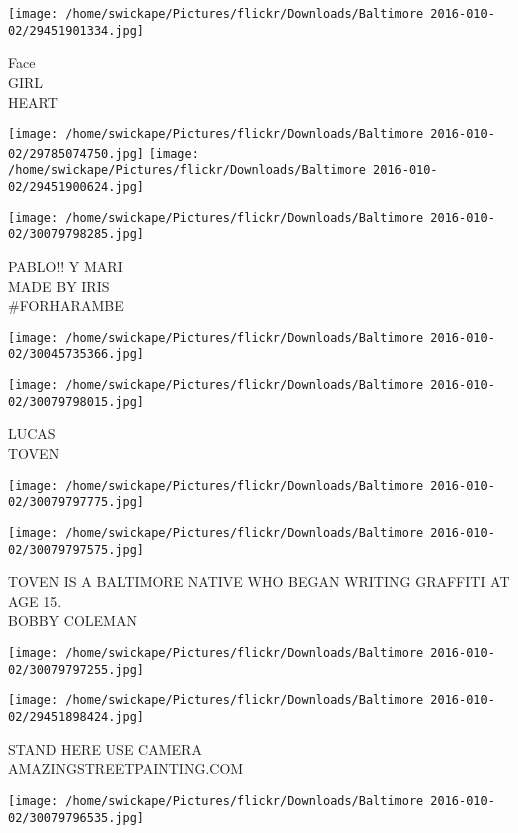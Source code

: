 \documentclass[10pt,letterpaper]{article}
\begin{document}
\vspace{0.25in}
\texttt{[image: /home/swickape/Pictures/flickr/Downloads/Baltimore 2016-010-02/29451901334.jpg]}

Face\\
GIRL\\
HEART
\pagebreak

\texttt{[image: /home/swickape/Pictures/flickr/Downloads/Baltimore 2016-010-02/29785074750.jpg]}
\texttt{[image: /home/swickape/Pictures/flickr/Downloads/Baltimore 2016-010-02/29451900624.jpg]}

\vspace{0.25in}
\texttt{[image: /home/swickape/Pictures/flickr/Downloads/Baltimore 2016-010-02/30079798285.jpg]}

PABLO!! Y MARI\\
MADE BY IRIS\\
\#FORHARAMBE
\pagebreak

\texttt{[image: /home/swickape/Pictures/flickr/Downloads/Baltimore 2016-010-02/30045735366.jpg]}

\vspace{0.25in}
\texttt{[image: /home/swickape/Pictures/flickr/Downloads/Baltimore 2016-010-02/30079798015.jpg]}

LUCAS\\
TOVEN
\pagebreak

\texttt{[image: /home/swickape/Pictures/flickr/Downloads/Baltimore 2016-010-02/30079797775.jpg]}

\vspace{0.25in}
\texttt{[image: /home/swickape/Pictures/flickr/Downloads/Baltimore 2016-010-02/30079797575.jpg]}

TOVEN IS A BALTIMORE NATIVE WHO BEGAN WRITING GRAFFITI AT AGE 15.\\
BOBBY COLEMAN
\pagebreak

\texttt{[image: /home/swickape/Pictures/flickr/Downloads/Baltimore 2016-010-02/30079797255.jpg]}

\vspace{0.25in}
\texttt{[image: /home/swickape/Pictures/flickr/Downloads/Baltimore 2016-010-02/29451898424.jpg]}

STAND HERE USE CAMERA\\
AMAZINGSTREETPAINTING.COM
\pagebreak

\texttt{[image: /home/swickape/Pictures/flickr/Downloads/Baltimore 2016-010-02/30079796535.jpg]}
\end{document}
